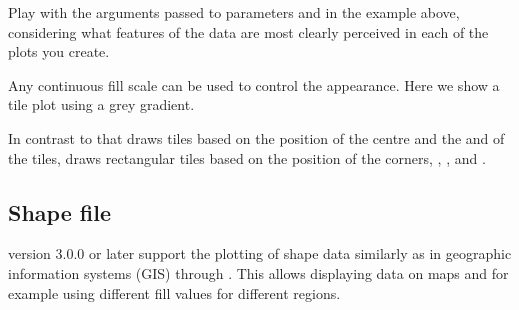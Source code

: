 \documentclass[krantz2]{krantz}\usepackage{knitr}%
\begin{document}
\begin{playground}
Play with the arguments passed to parameters  and  in the example above, considering what features of the data are most clearly perceived in each of the plots you create.
\end{playground}

Any continuous fill scale can be used to control the appearance. Here we show a tile plot using a grey gradient.

\begin{knitrout}\footnotesize
{}\color{fgcolor}\begin{kframe}
\begin{alltt}
    \hlopt{+}
  \hlstd{(} \hlstd{=} \hlstd{)} \hlopt{+}
  \hlstd{(} \hlstd{=} \hlstd{,}  \hlstd{=} \hlstd{,}  \hlstd{=} \hlstd{)}
\end{alltt}
\end{kframe}
\end{knitrout}

In contrast to  that draws tiles based on the position of the centre and the  and  of the tiles,  draws rectangular tiles based on the position of the corners, , ,  and .


\subsection{Shape file}

\ggplot version 3.0.0 or later support the plotting of shape data similarly as in geographic information systems (GIS) through . This allows displaying data on maps and for example using different fill values for different regions.
\end{document}
